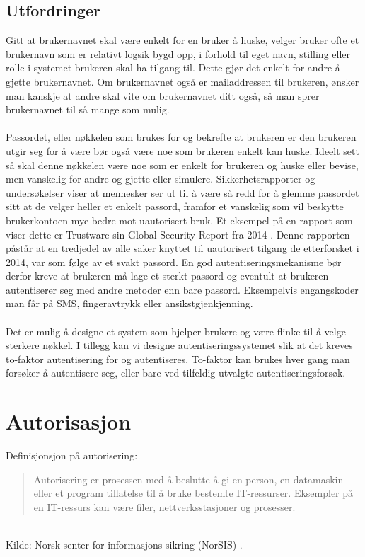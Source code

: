\subsection*{Utfordringer}
Gitt at brukernavnet skal være enkelt for en bruker å huske, velger bruker ofte et brukernavn som er relativt logsik bygd opp, i forhold til eget navn, stilling eller rolle i systemet brukeren skal ha tilgang til. Dette gjør det enkelt for andre å gjette brukernavnet. Om brukernavnet også er mailaddressen til brukeren, ønsker man kanskje at andre skal vite om brukernavnet ditt også, så man sprer brukernavnet til så mange som mulig. 
\\
\\
Passordet, eller nøkkelen som brukes for og bekrefte at brukeren er den brukeren utgir seg for å være bør også være noe som brukeren enkelt kan huske. Ideelt sett så skal denne nøkkelen være noe som er enkelt for brukeren og huske eller bevise, men vanskelig for andre og gjette eller simulere. Sikkerhetsrapporter og undersøkelser viser at mennesker ser ut til å være så redd for å glemme passordet sitt at de velger heller et enkelt passord, framfor et vanskelig som vil beskytte brukerkontoen mye bedre mot uautorisert bruk. Et eksempel på en rapport som viser dette er Trustware sin Global Security Report fra 2014 \cite{TruswareGlobalSecurityReport2014}. Denne rapporten påstår at en tredjedel av alle saker knyttet til uautorisert tilgang de etterforsket i 2014, var som følge av et svakt passord. En god autentiseringsmekanisme bør derfor kreve at brukeren må lage et sterkt passord og eventult at brukeren autentiserer seg med andre metoder enn bare passord. Eksempelvis engangskoder man får på SMS, fingeravtrykk eller ansikstgjenkjenning. 
\\
\\
Det er mulig å designe et system som hjelper brukere og være flinke til å velge sterkere nøkkel. I tillegg kan vi designe autentiseringssystemet slik at det kreves to-faktor autentisering for og autentiseres. To-faktor kan brukes hver gang man forsøker å autentisere seg, eller bare ved tilfeldig utvalgte autentiseringsforsøk.

\section{Autorisasjon}
\label{sec:teoridel_autorisasjon}
Definisjonsjon på autorisering: \\
\begin{quote}
Autorisering er prosessen med å beslutte å gi en person, en datamaskin eller et program tillatelse til å bruke bestemte IT-ressurser. Eksempler på en IT-ressurs kan være filer, nettverksstasjoner og prosesser.
\end{quote} \\
Kilde: Norsk senter for informasjons sikring (NorSIS) \cite{NorsisLeksikonAutorisering}. \\
